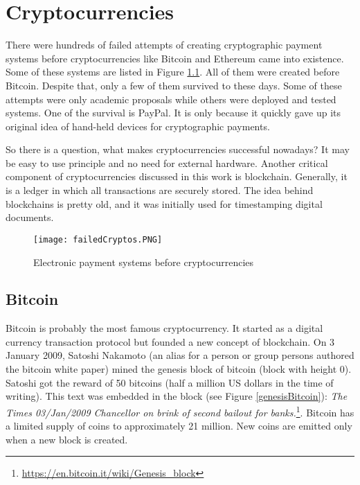 \chapter{Cryptocurrencies}
\label{Cryptocurrencies}

There were hundreds of failed attempts of creating cryptographic payment systems before cryptocurrencies like Bitcoin and Ethereum came into existence. Some of these systems are listed in Figure \ref{paymentSystems}. All of them were created before Bitcoin. Despite that, only a few of them survived to these days. Some of these attempts were only academic proposals while others were deployed and tested systems. One of the survival is PayPal. It is only because it quickly gave up its original idea of hand-held devices for cryptographic payments. \cite{wayner1997digital}

So there is a question, what makes cryptocurrencies successful nowadays?  It may be easy to use principle and no need for external hardware. 
Another critical component of cryptocurrencies discussed in this work is blockchain. Generally, it is a ledger in which all transactions are securely stored. The idea behind blockchains is pretty old, and it was initially used for timestamping digital documents. \cite{haber1990time} 


\begin{figure}[h]
    \centering
    \texttt{[image: failedCryptos.PNG]}
    \caption{Electronic payment systems before cryptocurrencies\cite{narayanan2016bitcoin}}
    \label{paymentSystems}
\end{figure}


\section{Bitcoin}
Bitcoin is probably the most famous cryptocurrency. It started as a digital currency transaction protocol but founded a new concept of blockchain\cite{ChowdhuryNiaz2020Ibba}. On 3 January 2009, Satoshi Nakamoto (an alias for a person or group persons authored the bitcoin white paper) mined the genesis block of bitcoin (block with height 0). Satoshi got the reward of 50 bitcoins (half a million US dollars in the time of writing). This text was embedded in the block (see Figure \ref{genesisBitcoin}): \textit{The Times 03/Jan/2009 Chancellor on brink of second bailout for banks.}\footnote{\url{https://en.bitcoin.it/wiki/Genesis\_block}}\cite{newYorkerBTC}. Bitcoin has a limited supply of coins to approximately 21 million. New coins are emitted only when a new block is created. \cite{nakamoto2008peer}

